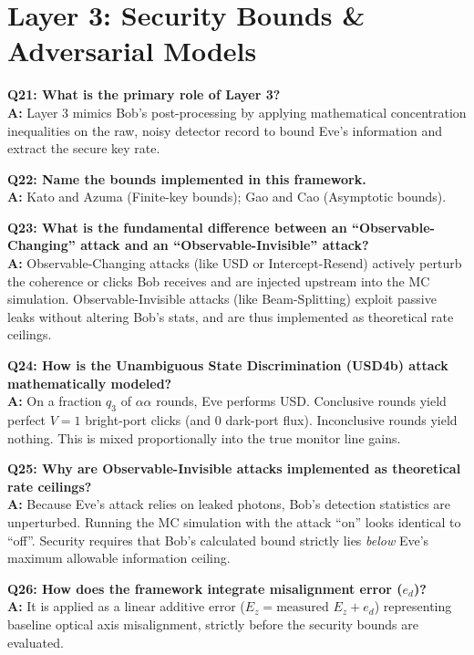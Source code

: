 \documentclass[11pt, a4paper]{article}
\begin{document}
\section{Layer 3: Security Bounds \& Adversarial Models}

\textbf{Q21: What is the primary role of Layer 3?} \\
\textbf{A:} Layer 3 mimics Bob's post-processing by applying mathematical concentration inequalities on the raw, noisy detector record to bound Eve's information and extract the secure key rate.

\textbf{Q22: Name the bounds implemented in this framework.} \\
\textbf{A:} Kato and Azuma (Finite-key bounds); Gao and Cao (Asymptotic bounds).

\textbf{Q23: What is the fundamental difference between an ``Observable-Changing'' attack and an ``Observable-Invisible'' attack?} \\
\textbf{A:} Observable-Changing attacks (like USD or Intercept-Resend) actively perturb the coherence or clicks Bob receives and are injected upstream into the MC simulation. Observable-Invisible attacks (like Beam-Splitting) exploit passive leaks without altering Bob's stats, and are thus implemented as theoretical rate ceilings.

\textbf{Q24: How is the Unambiguous State Discrimination (USD4b) attack mathematically modeled?} \\
\textbf{A:} On a fraction $q_3$ of $\alpha\alpha$ rounds, Eve performs USD. Conclusive rounds yield perfect $V=1$ bright-port clicks (and $0$ dark-port flux). Inconclusive rounds yield nothing. This is mixed proportionally into the true monitor line gains.

\textbf{Q25: Why are Observable-Invisible attacks implemented as theoretical rate ceilings?} \\
\textbf{A:} Because Eve's attack relies on leaked photons, Bob's detection statistics are unperturbed. Running the MC simulation with the attack ``on'' looks identical to ``off''. Security requires that Bob's calculated bound strictly lies \textit{below} Eve's maximum allowable information ceiling.

\textbf{Q26: How does the framework integrate misalignment error ($e_d$)?} \\
\textbf{A:} It is applied as a linear additive error ($E_z = \text{measured } E_z + e_d$) representing baseline optical axis misalignment, strictly before the security bounds are evaluated.
\end{document}
